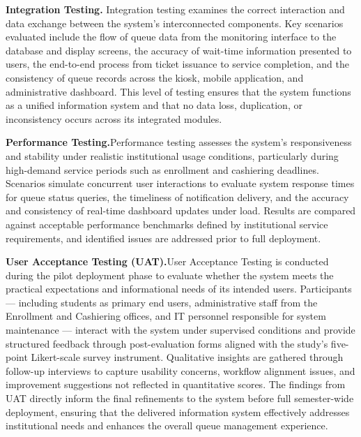 \documentclass{research}
\begin{document}
\indent\textbf{Integration Testing.} Integration testing examines the correct interaction and data exchange between
the system's interconnected components. Key scenarios evaluated include the
flow of queue data from the monitoring interface to the database and display
screens, the accuracy of wait-time information presented to users, the
end-to-end process from ticket issuance to service completion, and the
consistency of queue records across the kiosk, mobile application, and
administrative dashboard. This level of testing ensures that the system
functions as a unified information system and that no data loss, duplication,
or inconsistency occurs across its integrated modules.
 
\indent\textbf{Performance Testing.}Performance testing assesses the system's responsiveness and stability under
realistic institutional usage conditions, particularly during high-demand
service periods such as enrollment and cashiering deadlines. Scenarios
simulate concurrent user interactions to evaluate system response times for
queue status queries, the timeliness of notification delivery, and the
accuracy and consistency of real-time dashboard updates under load. Results
are compared against acceptable performance benchmarks defined by
institutional service requirements, and identified issues are addressed prior
to full deployment.
 
\indent\textbf{User Acceptance Testing (UAT).}User Acceptance Testing is conducted during the pilot deployment phase to
evaluate whether the system meets the practical expectations and informational
needs of its intended users. Participants --- including students as primary
end users, administrative staff from the Enrollment and Cashiering offices,
and IT personnel responsible for system maintenance --- interact with the
system under supervised conditions and provide structured feedback through
post-evaluation forms aligned with the study's five-point Likert-scale survey
instrument. Qualitative insights are gathered through follow-up interviews to
capture usability concerns, workflow alignment issues, and improvement
suggestions not reflected in quantitative scores. The findings from UAT
directly inform the final refinements to the system before full
semester-wide deployment, ensuring that the delivered information system
effectively addresses institutional needs and enhances the overall queue
management experience.

\clearpage

\end{document}
